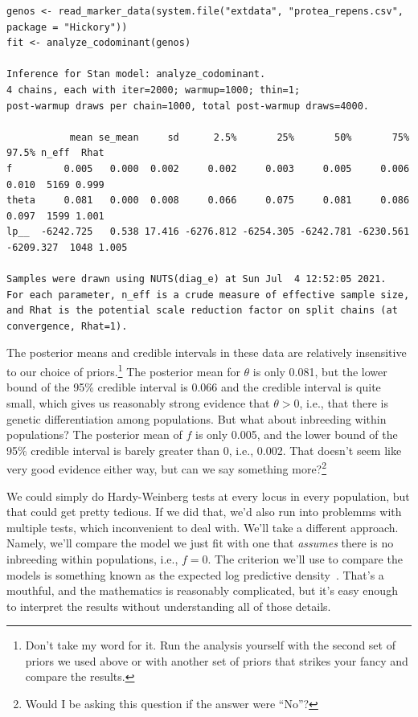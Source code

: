 {\small
\begin{verbatim}
genos <- read_marker_data(system.file("extdata", "protea_repens.csv", package = "Hickory"))
fit <- analyze_codominant(genos)

Inference for Stan model: analyze_codominant.
4 chains, each with iter=2000; warmup=1000; thin=1; 
post-warmup draws per chain=1000, total post-warmup draws=4000.

           mean se_mean     sd      2.5%       25%       50%       75%     97.5% n_eff  Rhat
f         0.005   0.000  0.002     0.002     0.003     0.005     0.006     0.010  5169 0.999
theta     0.081   0.000  0.008     0.066     0.075     0.081     0.086     0.097  1599 1.001
lp__  -6242.725   0.538 17.416 -6276.812 -6254.305 -6242.781 -6230.561 -6209.327  1048 1.005

Samples were drawn using NUTS(diag_e) at Sun Jul  4 12:52:05 2021.
For each parameter, n_eff is a crude measure of effective sample size,
and Rhat is the potential scale reduction factor on split chains (at 
convergence, Rhat=1).
\end{verbatim}
}

The posterior means and credible intervals in these data are
relatively insensitive to our choice of priors.\footnote{Don't take my
  word for it. Run the analysis yourself with the second set of priors
  we used above or with another set of priors that strikes your fancy
  and compare the results.} The posterior mean for $\theta$ is only
0.081, but the lower bound of the 95\% credible interval is 0.066 and
the credible interval is quite small, which gives us reasonably strong
evidence that $\theta > 0$, i.e., that there is genetic
differentiation among populations. But what about inbreeding within
populations? The posterior mean of $f$ is only 0.005, and the lower
bound of the 95\% credible interval is barely greater than 0, i.e.,
0.002. That doesn't seem like very good evidence either way, but can
we say something more?\footnote{Would I be asking this question if the
  answer were ``No''?}

We could simply do Hardy-Weinberg tests at every locus in every
population, but that could get pretty tedious. If we did that, we'd
also run into problemms with multiple tests, which inconvenient to
deal with. We'll take a different approach. Namely, we'll compare the
model we just fit with one that {\it assumes\/} there is no inbreeding
within populations, i.e., $f = 0$. The criterion we'll use to compare
the models is something known as the expected log predictive
density~\cite{Vehtari-etal-2017}. That's a mouthful, and the
mathematics is reasonably complicated, but it's easy enough to
interpret the results without understanding all of those details.

